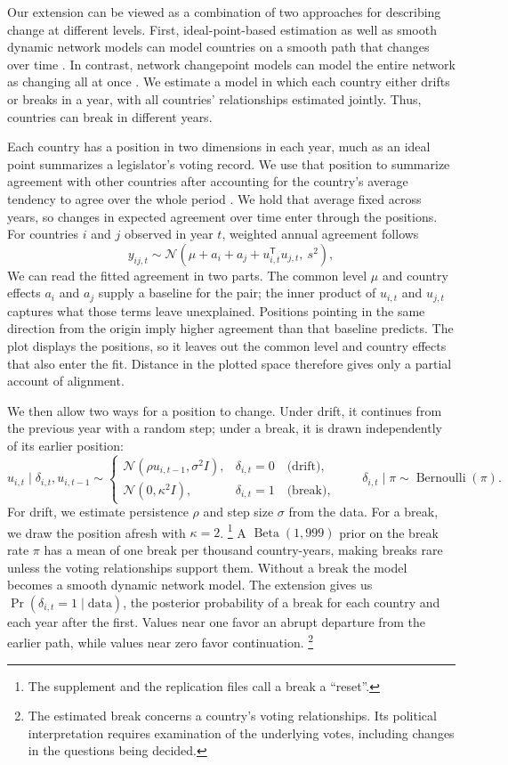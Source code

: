 \documentclass[12pt,authoryear]{elsarticle}
\begin{document}
Our extension can be viewed as a combination of two approaches for describing change at different levels. First, ideal-point-based estimation as well as smooth dynamic network models can model countries on a smooth path that changes over time \citep{bailey:strezhnev:voeten:2017,sewell:chen:2015}. In contrast, network changepoint models can model the entire network as changing all at once \citep{park:sohn:2020}. We estimate a model in which each country either drifts or breaks in a year, with all countries' relationships estimated jointly. Thus, countries can break in different years.

Each country has a position in two dimensions in each year, much as an ideal point summarizes a legislator's voting record. We use that position to summarize agreement with other countries after accounting for the country's average tendency to agree over the whole period \citep{hoff:2021,minhas:etal:2019}. We hold that average fixed across years, so changes in expected agreement over time enter through the positions. For countries $i$ and $j$ observed in year $t$, weighted annual agreement follows
\[
y_{ij,t}\sim\mathcal N\!\left(\mu+a_i+a_j+u_{i,t}^{\mathsf T}u_{j,t},\ s^2\right),
\]
We can read the fitted agreement in two parts. The common level $\mu$ and country effects $a_i$ and $a_j$ supply a baseline for the pair; the inner product of $u_{i,t}$ and $u_{j,t}$ captures what those terms leave unexplained. Positions pointing in the same direction from the origin imply higher agreement than that baseline predicts. The plot displays the positions, so it leaves out the common level and country effects that also enter the fit. Distance in the plotted space therefore gives only a partial account of alignment.

We then allow two ways for a position to change. Under drift, it continues from the previous year with a random step; under a break, it is drawn independently of its earlier position:
\[
u_{i,t}\mid\delta_{i,t},u_{i,t-1}\sim
\begin{cases}
\mathcal N(\rho u_{i,t-1},\sigma^2 I), & \delta_{i,t}=0 \quad\text{(drift)},\\
\mathcal N(0,\kappa^2 I), & \delta_{i,t}=1 \quad\text{(break)},
\end{cases}
\qquad \delta_{i,t}\mid\pi\sim\operatorname{Bernoulli}(\pi).
\]
For drift, we estimate persistence $\rho$ and step size $\sigma$ from the data. For a break, we draw the position afresh with $\kappa=2$. \footnote{The supplement and the replication files call a break a ``reset''.} A $\operatorname{Beta}(1,999)$ prior on the break rate $\pi$ has a mean of one break per thousand country-years, making breaks rare unless the voting relationships support them. Without a break the model becomes a smooth dynamic network model. The extension gives us $\Pr(\delta_{i,t}=1\mid\text{data})$, the posterior probability of a break for each country and each year after the first. Values near one favor an abrupt departure from the earlier path, while values near zero favor continuation. \footnote{The estimated break concerns a country's voting relationships. Its political interpretation requires examination of the underlying votes, including changes in the questions being decided.}
\end{document}
